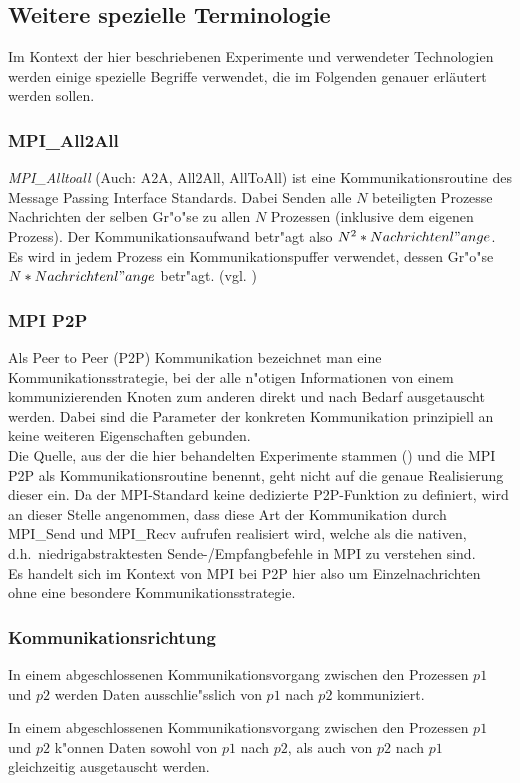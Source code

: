 \subsection{Weitere spezielle Terminologie}
Im Kontext der hier beschriebenen Experimente und verwendeter Technologien werden einige spezielle Begriffe verwendet, die im Folgenden genauer erläutert werden sollen.

\subsubsection{MPI\_All2All}
\textit{MPI\_Alltoall} (Auch: A2A, All2All, AllToAll) ist eine Kommunikationsroutine des Message Passing Interface Standards. Dabei Senden alle $N$ beteiligten Prozesse Nachrichten der selben Gr"o"se zu allen $N$ Prozessen (inklusive dem eigenen Prozess). Der Kommunikationsaufwand betr"agt also $N^2 * Nachrichtenl"ange$.\\
Es wird in jedem Prozess ein Kommunikationspuffer verwendet, dessen Gr"o"se $N*Nachrichtenl"ange$ betr"agt. (vgl. \cite{MPImanpage})\\

\subsubsection{MPI P2P}
Als Peer to Peer (P2P) Kommunikation bezeichnet man eine Kommunikationsstrategie, bei der alle n"otigen Informationen von einem kommunizierenden Knoten zum anderen direkt und nach Bedarf ausgetauscht werden. 
Dabei sind die Parameter der konkreten Kommunikation prinzipiell an keine weiteren Eigenschaften gebunden.\\
Die Quelle, aus der die hier behandelten Experimente stammen (\cite{mainpaper}) und die MPI P2P als Kommunikationsroutine benennt, geht nicht auf die genaue Realisierung dieser ein. Da der MPI-Standard keine dedizierte P2P-Funktion zu definiert, wird an dieser Stelle angenommen, dass diese Art der Kommunikation durch MPI\_Send und MPI\_Recv aufrufen realisiert wird, welche als die nativen, d.h.~niedrigabstraktesten Sende-/Empfangbefehle in MPI zu verstehen sind.\\
Es handelt sich im Kontext von MPI bei P2P hier also um Einzelnachrichten ohne eine besondere Kommunikationsstrategie.\\

\subsubsection{Kommunikationsrichtung}
\begin{defi}
In einem abgeschlossenen Kommunikationsvorgang zwischen den Prozessen $p1$ und $p2$ werden Daten ausschlie"sslich von $p1$ nach $p2$ kommuniziert.
\end{defi}
\begin{defi}
In einem abgeschlossenen Kommunikationsvorgang zwischen den Prozessen $p1$ und $p2$ k"onnen Daten sowohl von $p1$ nach $p2$, als auch von $p2$ nach $p1$ gleichzeitig ausgetauscht werden.
\end{defi}

